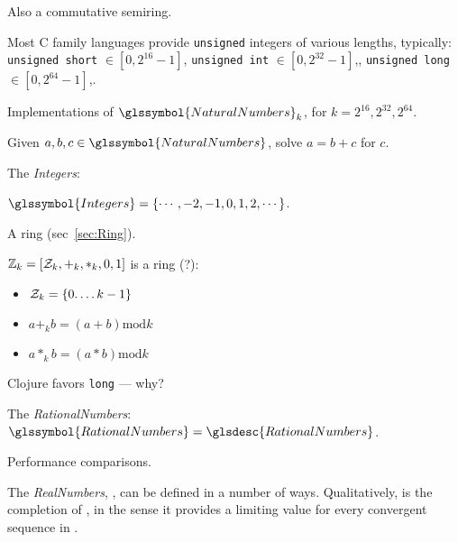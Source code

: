 Also a commutative semiring.

\label{sec:unsigned-int}

Most C family languages provide \texttt{unsigned} integers
of various lengths, typically: 
\texttt{unsigned short} $\in \left[ 0, 2^{16} - 1 \right]$,
\texttt{unsigned int} $\in \left[ 0, 2^{32} - 1 \right]$,,
\texttt{unsigned long} $\in \left[ 0, 2^{64} - 1 \right]$,.

Implementations of $\glssymbol{NaturalNumbers}_{k}$,
for $k = 2^{16}, 2^{32}, 2^{64}$.

\label{sec:Integers}

Given $a,b,c \in \glssymbol{NaturalNumbers}$,
solve $a = b + c$ for $c$.

The \textit{\gls{Integers}}: 

$\glssymbol{Integers} = \{\cdots, -2, -1, 0, 1, 2, \cdots\}$.

A ring (sec~\ref{sec:Ring}).

\label{sec:Cyclic-integers}

$\mathbb{Z}_{k} = \left[ \mathcal{Z}_{k}, +_k, *_k, 0, 1 \right]$
is a ring (?):
\begin{itemize}
  \item $\mathcal{Z}_{k} = \left\{ 0. \ldots k-1  \right\}$
  \item $ a +_k b = \left( a + b \right) \text{mod} k$
  \item $ a *_k b = \left( a * b \right) \text{mod} k$
\end{itemize}

\label{sec:int}

Clojure favors \texttt{long} --- why?

\label{sec:BigInteger}

\label{sec:Rational-numbers}

The \textit{\gls{RationalNumbers}}: 
$\glssymbol{RationalNumbers} = \glsdesc{RationalNumbers}$.

\label{sec:BigFraction}

Performance comparisons.

\label{sec:Real-numbers}

The \textit{\gls{RealNumbers}}, ,
can be defined in a number of ways. 
Qualitatively,  is the completion of
, in the sense it provides a limiting value for every
convergent sequence in .

